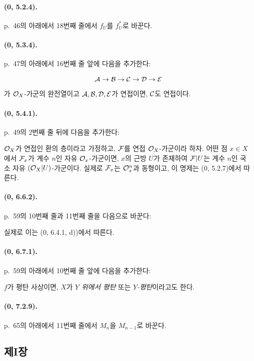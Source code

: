 \paragraph{(0, 5.2.4).}
p.~46의 아래에서 18번째 줄에서 $f_U$를 $f_U^*$로 바꾼다.

\paragraph{(0, 5.3.4).}
p.~47의 아래에서 16번째 줄 앞에 다음을 추가한다:

\[
  \mathcal{A}\to\mathcal{B}\to\mathcal{C}\to\mathcal{D}\to\mathcal{E}
\]
가 $\mathcal{O}_X$-가군의 완전열이고
$\mathcal{A},\mathcal{B},\mathcal{D},\mathcal{E}$가 연접이면, $\mathcal{C}$도
연접이다.

\paragraph{(0, 5.4.1).}
p.~49의 2번째 줄 뒤에 다음을 추가한다:

$\mathcal{O}_X$가 연접인 환의 층이라고 가정하고, $\mathcal{F}$를 연접
$\mathcal{O}_X$-가군이라 하자. 어떤 점 $x\in X$에서 $\mathcal{F}_x$가
계수 $n$인 자유 $\mathcal{O}_x$-가군이면, $x$의 근방 $U$가 존재하여
$\mathcal{F}|U$는 계수 $n$인 국소 자유 $(\mathcal{O}_X|U)$-가군이다. 실제로
$\mathcal{F}_x$는 $\mathcal{O}_x^n$과 동형이고, 이 명제는
(0, 5.2.7)에서 따른다.

\paragraph{(0, 6.6.2).}
p.~59의 10번째 줄과 11번째 줄을 다음으로 바꾼다:

실제로 이는 (0, 6.4.1, d))에서 따른다.

\paragraph{(0, 6.7.1).}
p.~59의 아래에서 10번째 줄 앞에 다음을 추가한다:

$f$가 평탄 사상이면, $X$가 \emph{$Y$ 위에서 평탄} 또는
\emph{$Y$-평탄}이라고도 한다.

\paragraph{(0, 7.2.9).}
p.~65의 아래에서 11번째 줄에서 $M_n$을 $M_{n-1}$로 바꾼다.

\subsection*{제I장}

